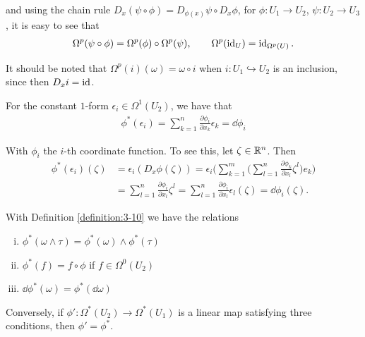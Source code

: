and using the chain rule $D_x(\psi\circ\phi) = D_{\phi(x)}\psi\circ D_x\phi$, for $\phi:U_1\to U_2$, 
$\psi:U_2\to U_3$, it is easy to see that 
\begin{align*}
  \Omega^p(\psi\circ\phi) = \Omega^p(\phi)\circ\Omega^p(\psi),\qquad 
  \Omega^p(\operatorname{id}_U) = \operatorname{id}_{\Omega^p(U)}.
\end{align*}

It should be noted that $\Omega^p(i)(\omega) = \omega\circ i$ when $i:U_1\hookrightarrow U_2$ is an inclusion, since 
then $D_xi = \operatorname{id}$.

\begin{example}\label{example:3-11}
  For the constant $1$-form $\epsilon_i\in\Omega^1(U_2)$, we have that
  \begin{align*}
    \phi^*(\epsilon_i) 
    = \sum_{k=1}^{n }{\frac{\partial \phi_i }{\partial x_k }\epsilon_k} 
    = \dd\phi_i
  \end{align*}
\end{example}

With $\phi_i$ the $i$-th coordinate function. To see this, let $\zeta\in{\ensuremath{\mathbb{R}}}^n$. Then 
\begin{align*}
  \phi^{*}(\epsilon_{i})(\zeta)
  & = \epsilon_{i}(D_{x}\phi(\zeta))
      = \epsilon_{i}\Bigg(\sum_{k=1}^{m}\Big(\sum_{l=1}^{n}\frac{\partial\phi_{k}}{\partial x_{l}}\zeta^{l}\Big)e_{k}\Bigg) \\
  & = \sum_{l=1}^{n}\frac{\partial\phi_{i}}{\partial x_{l}}\zeta^{l}
      =\sum_{l=1}^{n}\frac{\partial\phi_{i}}{\partial x_{l}}\epsilon_{l}(\zeta)=\dd\phi_{i}(\zeta).
\end{align*}

\begin{theorem}\label{theorem:3-12}
With Definition \ref{definition:3-10} we have the relations
\begin{enumerate}[(i)]
  \item $\phi^*(\omega\wedge\tau) = \phi^*(\omega)\wedge\phi^*(\tau)$
  \item $\phi^*(f) = f\circ\phi$ if $f\in\Omega^0(U_2)$
  \item $\dd\phi^*(\omega) = \phi^*(\!\dd\omega)$
\end{enumerate}

Conversely, if $\phi':\Omega^*(U_2)\to\Omega^*(U_1)$ is a linear map satisfying three conditions, then $\phi'=\phi^*$.
\end{theorem}

